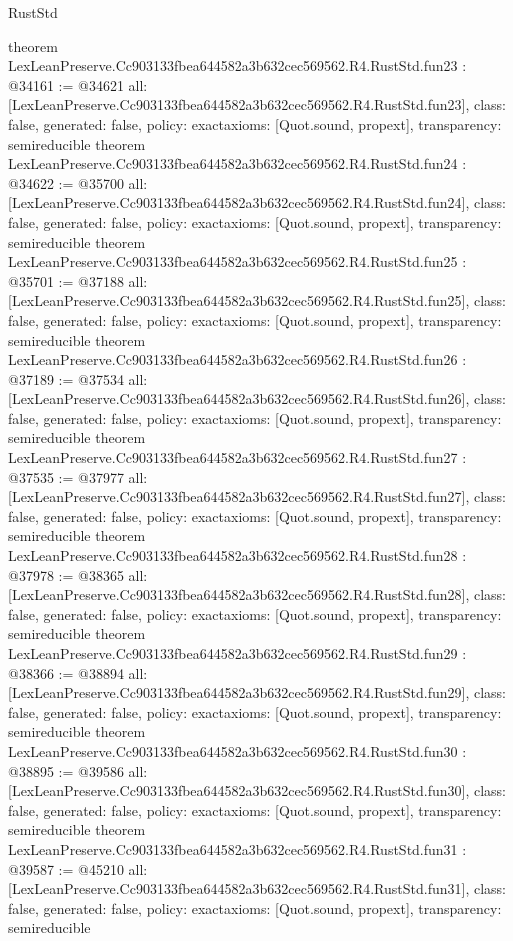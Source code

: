 \begin{lexlean}{RustStd}
\begin{coremodule}
{}
theorem LexLeanPreserve.Cc903133fbea644582a3b632cec569562.R4.RustStd.fun23 : @34161 := @34621 {
  all: [LexLeanPreserve.Cc903133fbea644582a3b632cec569562.R4.RustStd.fun23],
  class: false,
  generated: false,
  policy: exact{axioms: [Quot.sound, propext]},
  transparency: semireducible
}
theorem LexLeanPreserve.Cc903133fbea644582a3b632cec569562.R4.RustStd.fun24 : @34622 := @35700 {
  all: [LexLeanPreserve.Cc903133fbea644582a3b632cec569562.R4.RustStd.fun24],
  class: false,
  generated: false,
  policy: exact{axioms: [Quot.sound, propext]},
  transparency: semireducible
}
theorem LexLeanPreserve.Cc903133fbea644582a3b632cec569562.R4.RustStd.fun25 : @35701 := @37188 {
  all: [LexLeanPreserve.Cc903133fbea644582a3b632cec569562.R4.RustStd.fun25],
  class: false,
  generated: false,
  policy: exact{axioms: [Quot.sound, propext]},
  transparency: semireducible
}
theorem LexLeanPreserve.Cc903133fbea644582a3b632cec569562.R4.RustStd.fun26 : @37189 := @37534 {
  all: [LexLeanPreserve.Cc903133fbea644582a3b632cec569562.R4.RustStd.fun26],
  class: false,
  generated: false,
  policy: exact{axioms: [Quot.sound, propext]},
  transparency: semireducible
}
theorem LexLeanPreserve.Cc903133fbea644582a3b632cec569562.R4.RustStd.fun27 : @37535 := @37977 {
  all: [LexLeanPreserve.Cc903133fbea644582a3b632cec569562.R4.RustStd.fun27],
  class: false,
  generated: false,
  policy: exact{axioms: [Quot.sound, propext]},
  transparency: semireducible
}
theorem LexLeanPreserve.Cc903133fbea644582a3b632cec569562.R4.RustStd.fun28 : @37978 := @38365 {
  all: [LexLeanPreserve.Cc903133fbea644582a3b632cec569562.R4.RustStd.fun28],
  class: false,
  generated: false,
  policy: exact{axioms: [Quot.sound, propext]},
  transparency: semireducible
}
theorem LexLeanPreserve.Cc903133fbea644582a3b632cec569562.R4.RustStd.fun29 : @38366 := @38894 {
  all: [LexLeanPreserve.Cc903133fbea644582a3b632cec569562.R4.RustStd.fun29],
  class: false,
  generated: false,
  policy: exact{axioms: [Quot.sound, propext]},
  transparency: semireducible
}
theorem LexLeanPreserve.Cc903133fbea644582a3b632cec569562.R4.RustStd.fun30 : @38895 := @39586 {
  all: [LexLeanPreserve.Cc903133fbea644582a3b632cec569562.R4.RustStd.fun30],
  class: false,
  generated: false,
  policy: exact{axioms: [Quot.sound, propext]},
  transparency: semireducible
}
theorem LexLeanPreserve.Cc903133fbea644582a3b632cec569562.R4.RustStd.fun31 : @39587 := @45210 {
  all: [LexLeanPreserve.Cc903133fbea644582a3b632cec569562.R4.RustStd.fun31],
  class: false,
  generated: false,
  policy: exact{axioms: [Quot.sound, propext]},
  transparency: semireducible
}
\end{coremodule}
\end{lexlean}
